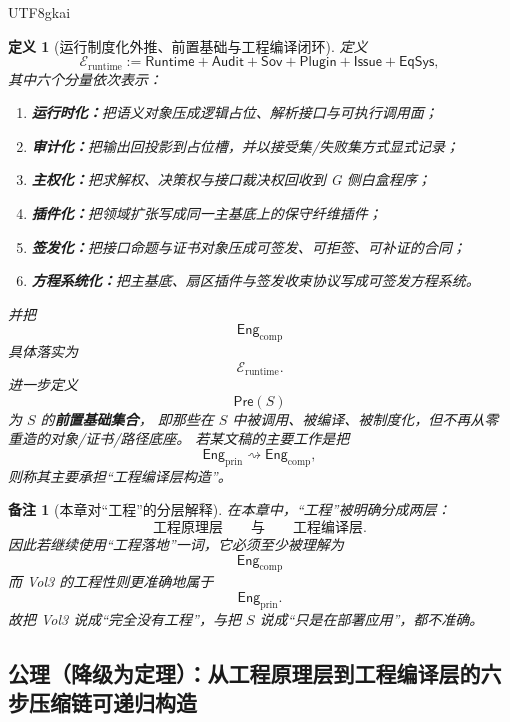 \documentclass[12pt]{article}
\newtheorem{definition}{定义}[section]
\newtheorem{remark}{备注}[section]
\begin{document}
\begin{CJK*}{UTF8}{gkai}
\begin{definition}[运行制度化外推、前置基础与工程编译闭环]
\label{def:tex37-ch18-runtime}
定义
\[
  \mathcal{E}_{\mathrm{runtime}}
  :=
  \mathsf{Runtime}
  +
  \mathsf{Audit}
  +
  \mathsf{Sov}
  +
  \mathsf{Plugin}
  +
  \mathsf{Issue}
  +
  \mathsf{EqSys},
\]
其中六个分量依次表示：
\begin{enumerate}
  \item \textbf{运行时化：}把语义对象压成逻辑占位、解析接口与可执行调用面；
  \item \textbf{审计化：}把输出回投影到占位槽，并以接受集/失败集方式显式记录；
  \item \textbf{主权化：}把求解权、决策权与接口裁决权回收到 G 侧白盒程序；
  \item \textbf{插件化：}把领域扩张写成同一主基底上的保守纤维插件；
  \item \textbf{签发化：}把接口命题与证书对象压成可签发、可拒签、可补证的合同；
  \item \textbf{方程系统化：}把主基底、扇区插件与签发收束协议写成可签发方程系统。
\end{enumerate}
并把
\[
  \mathsf{Eng}_{\mathrm{comp}}
\]
具体落实为
\[
  \mathcal{E}_{\mathrm{runtime}}.
\]
进一步定义
\[
  \mathsf{Pre}(S)
\]
为 $S$ 的\textbf{前置基础集合}，
即那些在 $S$ 中被调用、被编译、被制度化，但不再从零重造的对象/证书/路径底座。
若某文稿的主要工作是把
\[
  \mathsf{Eng}_{\mathrm{prin}}
  \rightsquigarrow
  \mathsf{Eng}_{\mathrm{comp}},
\]
则称其主要承担“工程编译层构造”。
\end{definition}

\begin{remark}[本章对“工程”的分层解释]
\label{rem:tex37-ch18-engineering-scope}
在本章中，“工程”被明确分成两层：
\[
  \text{工程原理层}
  \qquad\text{与}\qquad
  \text{工程编译层}.
\]
因此若继续使用“工程落地”一词，它必须至少被理解为
\[
  \mathsf{Eng}_{\mathrm{comp}}
\]
而 Vol3 的工程性则更准确地属于
\[
  \mathsf{Eng}_{\mathrm{prin}}.
\]
故把 Vol3 说成“完全没有工程”，与把 $S$ 说成“只是在部署应用”，都不准确。
\end{remark}

\subsection{公理（降级为定理）：从工程原理层到工程编译层的六步压缩链可递归构造}
\label{subsec:tex37-ch18-axiom}


\end{CJK*}
\end{document}
